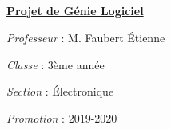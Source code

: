 \documentclass[a4paper,12pt]{report}
\begin{document}
\paragraph{}
\textbf{\underline{Projet de Génie Logiciel}} \par 
\textit{Professeur} : M. Faubert Étienne \par 
\textit{Classe} : 3ème année \par 
\textit{Section} : Électronique \par 
\textit{Promotion} : 2019-2020

\tableofcontents

\chapter*{}













\end{document}
